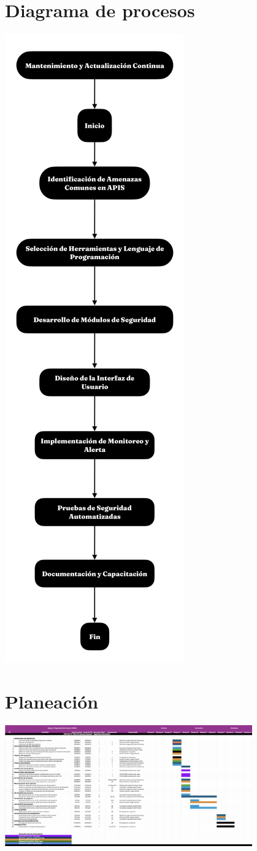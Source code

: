\documentclass{article}
\begin{document}
    \section{Diagrama de procesos}
    \includegraphics[height=1\textwidth, center]{Figura1.png}
    \section{Planeación}
    \includegraphics[width=0.8\textwidth, center]{Figura2.png}
\end{document}
